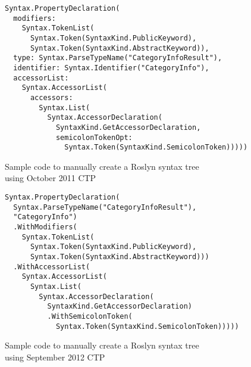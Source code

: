 \begin{figure}[p]

\begin{lstlisting}
Syntax.PropertyDeclaration(
  modifiers:
    Syntax.TokenList(
      Syntax.Token(SyntaxKind.PublicKeyword),
      Syntax.Token(SyntaxKind.AbstractKeyword)),
  type: Syntax.ParseTypeName("CategoryInfoResult"),
  identifier: Syntax.Identifier("CategoryInfo"),
  accessorList:
    Syntax.AccessorList(
      accessors:
        Syntax.List(
          Syntax.AccessorDeclaration(
            SyntaxKind.GetAccessorDeclaration,
            semicolonTokenOpt:
              Syntax.Token(SyntaxKind.SemicolonToken)))))
\end{lstlisting}

\caption{Sample code to manually create a Roslyn syntax tree \\ using October 2011 \ac{CTP}}
\label{Roslyn code 2011}
\end{figure}

\begin{figure}[p]

\begin{lstlisting}
Syntax.PropertyDeclaration(
  Syntax.ParseTypeName("CategoryInfoResult"),
  "CategoryInfo")
  .WithModifiers(
    Syntax.TokenList(
      Syntax.Token(SyntaxKind.PublicKeyword),
      Syntax.Token(SyntaxKind.AbstractKeyword)))
  .WithAccessorList(
    Syntax.AccessorList(
      Syntax.List(
        Syntax.AccessorDeclaration(
          SyntaxKind.GetAccessorDeclaration)
          .WithSemicolonToken(
            Syntax.Token(SyntaxKind.SemicolonToken)))))
\end{lstlisting}

\caption{Sample code to manually create a Roslyn syntax tree \\ using September 2012 \ac{CTP}}
\label{Roslyn code 2012}
\end{figure}